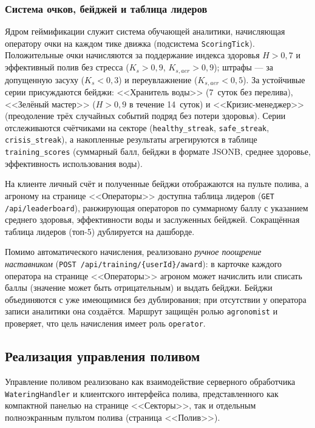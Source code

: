 \subsubsection{Система очков, бейджей и таблица лидеров}

Ядром геймификации служит система обучающей аналитики,
начисляющая оператору очки на каждом тике движка (подсистема
\texttt{ScoringTick}). Положительные очки начисляются за
поддержание индекса здоровья $H > 0{,}7$ и эффективный полив
без стресса ($K_s > 0{,}9$, $K_{s,aer} > 0{,}9$); штрафы ---
за допущенную засуху ($K_s < 0{,}3$) и переувлажнение
($K_{s,aer} < 0{,}5$). За устойчивые серии присуждаются
бейджи: <<Хранитель воды>> (7~суток без перелива),
<<Зелёный мастер>> ($H > 0{,}9$ в течение 14~суток) и
<<Кризис-менеджер>> (преодоление трёх случайных событий
подряд без потери здоровья). Серии отслеживаются счётчиками
на секторе (\texttt{healthy\_streak}, \texttt{safe\_streak},
\texttt{crisis\_streak}), а накопленные результаты
агрегируются в таблице \texttt{training\_scores} (суммарный
балл, бейджи в формате JSONB, среднее здоровье, эффективность
использования воды).

На клиенте личный счёт и полученные бейджи отображаются на
пульте полива, а агроному на странице <<Операторы>> доступна
таблица лидеров (\texttt{GET /api/leaderboard}), ранжирующая
операторов по суммарному баллу с указанием среднего здоровья,
эффективности воды и заслуженных бейджей. Сокращённая таблица
лидеров (топ-5) дублируется на дашборде.

Помимо автоматического начисления, реализовано
\emph{ручное поощрение наставником}
(\texttt{POST /api/training/\{userId\}/award}): в карточке
каждого оператора на странице <<Операторы>> агроном может
начислить или списать баллы (значение может быть
отрицательным) и выдать бейджи. Бейджи объединяются с уже
имеющимися без дублирования; при отсутствии у оператора
записи аналитики она создаётся. Маршрут защищён ролью
\texttt{agronomist} и проверяет, что цель начисления имеет
роль \texttt{operator}.


\subsection{Реализация управления поливом}

Управление поливом реализовано как взаимодействие серверного
обработчика \texttt{WateringHandler} и клиентского интерфейса
полива, представленного как компактной панелью на странице
<<Секторы>>, так и отдельным полноэкранным пультом полива
(страница <<Полив>>).

